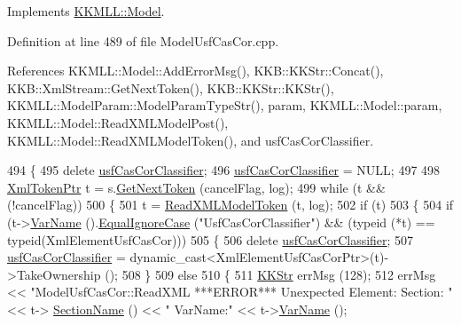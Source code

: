 Implements \hyperlink{class_k_k_m_l_l_1_1_model_ab7f1d1441936048db8cec7e9ec987f34}{K\+K\+M\+L\+L\+::\+Model}.



Definition at line 489 of file Model\+Usf\+Cas\+Cor.\+cpp.



References K\+K\+M\+L\+L\+::\+Model\+::\+Add\+Error\+Msg(), K\+K\+B\+::\+K\+K\+Str\+::\+Concat(), K\+K\+B\+::\+Xml\+Stream\+::\+Get\+Next\+Token(), K\+K\+B\+::\+K\+K\+Str\+::\+K\+K\+Str(), K\+K\+M\+L\+L\+::\+Model\+Param\+::\+Model\+Param\+Type\+Str(), param, K\+K\+M\+L\+L\+::\+Model\+::param, K\+K\+M\+L\+L\+::\+Model\+::\+Read\+X\+M\+L\+Model\+Post(), K\+K\+M\+L\+L\+::\+Model\+::\+Read\+X\+M\+L\+Model\+Token(), and usf\+Cas\+Cor\+Classifier.


\begin{DoxyCode}
494 \{
495   \textcolor{keyword}{delete}  \hyperlink{class_k_k_m_l_l_1_1_model_usf_cas_cor_a7aeb7274e64e73ccfeea3a9da6633d60}{usfCasCorClassifier};
496   \hyperlink{class_k_k_m_l_l_1_1_model_usf_cas_cor_a7aeb7274e64e73ccfeea3a9da6633d60}{usfCasCorClassifier} = NULL;
497 
498   \hyperlink{class_k_k_b_1_1_xml_token}{XmlTokenPtr}  t = s.\hyperlink{class_k_k_b_1_1_xml_stream_a87cc738b05c666cf5d5c25beaab477b4}{GetNextToken} (cancelFlag, log);
499   \textcolor{keywordflow}{while}  (t  &&  (!cancelFlag))
500   \{
501     t = \hyperlink{class_k_k_m_l_l_1_1_model_a9feaeb8870d1f137b74586bb434b09d2}{ReadXMLModelToken} (t, log);
502     \textcolor{keywordflow}{if}  (t)
503     \{
504       \textcolor{keywordflow}{if}  (t->\hyperlink{class_k_k_b_1_1_xml_token_a28b39cfdfa2ed63048a812b1cb52263c}{VarName} ().\hyperlink{class_k_k_b_1_1_k_k_str_a562f9696417c53f66bc4088eac072ab5}{EqualIgnoreCase} (\textcolor{stringliteral}{"UsfCasCorClassifier"})  &&  (\textcolor{keyword}{typeid} (*t) ==
       \textcolor{keyword}{typeid}(XmlElementUsfCasCor)))
505       \{
506         \textcolor{keyword}{delete} \hyperlink{class_k_k_m_l_l_1_1_model_usf_cas_cor_a7aeb7274e64e73ccfeea3a9da6633d60}{usfCasCorClassifier};
507         \hyperlink{class_k_k_m_l_l_1_1_model_usf_cas_cor_a7aeb7274e64e73ccfeea3a9da6633d60}{usfCasCorClassifier} = \textcolor{keyword}{dynamic\_cast<}XmlElementUsfCasCorPtr\textcolor{keyword}{>}(t)->TakeOwnership ();
508       \}
509       \textcolor{keywordflow}{else}
510       \{
511         \hyperlink{class_k_k_b_1_1_k_k_str}{KKStr}  errMsg (128);
512         errMsg << \textcolor{stringliteral}{"ModelUsfCasCor::ReadXML   ***ERROR***   Unexpected Element: Section: "} << t->
      \hyperlink{class_k_k_b_1_1_xml_token_a20aa05209eeafb58c1c595c15f07d504}{SectionName} () << \textcolor{stringliteral}{" VarName:"} << t->\hyperlink{class_k_k_b_1_1_xml_token_a28b39cfdfa2ed63048a812b1cb52263c}{VarName} ();

\end{DoxyCode}

